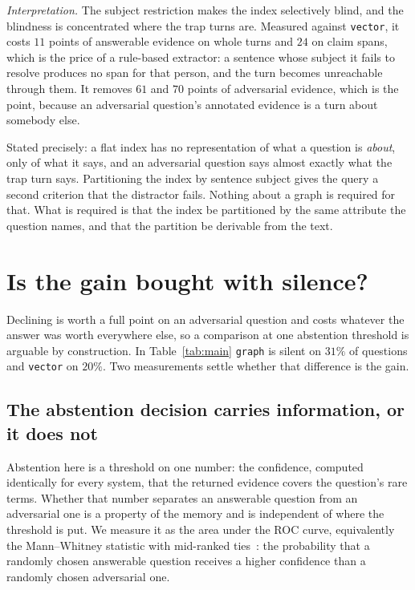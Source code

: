 \documentclass[11pt]{article}
\newcommand{\arm}[1]{\texttt{#1}}
\begin{document}


\emph{Interpretation.} The subject restriction makes the index selectively
blind, and the blindness is concentrated where the trap turns are. Measured
against \arm{vector}, it costs $11$ points of answerable evidence on whole turns
and $24$ on claim spans, which is the price of a rule-based extractor: a
sentence whose subject it fails to resolve produces no span for that person, and
the turn becomes unreachable through them. It removes $61$ and $70$ points of
adversarial evidence, which is the point, because an adversarial question's
annotated evidence is a turn about somebody else.

Stated precisely: a flat index has no representation of what a question is
\emph{about}, only of what it says, and an adversarial question says almost
exactly what the trap turn says. Partitioning
the index by sentence subject gives the query a second criterion that the
distractor fails. Nothing about a graph is required for that. What is required
is that the index be partitioned by the same attribute the question names, and
that the partition be derivable from the text.

\section{Is the gain bought with silence?}
\label{sec:abstention}

Declining is worth a full point on an adversarial question and costs whatever
the answer was worth everywhere else, so a comparison at one abstention
threshold is arguable by construction. In Table~\ref{tab:main} \arm{graph} is
silent on $31\%$ of questions and \arm{vector} on $20\%$. Two measurements
settle whether that difference is the gain.

\subsection{The abstention decision carries information, or it does not}

Abstention here is a threshold on one number: the confidence, computed
identically for every system, that the returned evidence covers the question's
rare terms. Whether that number separates an answerable question from an
adversarial one is a property of the memory and is independent of where the
threshold is put. We measure it as the area under the ROC curve, equivalently
the Mann--Whitney statistic with mid-ranked ties~\cite{hanleymcneil,mannwhitney}:
the probability that a randomly chosen answerable question receives a higher
confidence than a randomly chosen adversarial one.
\end{document}
